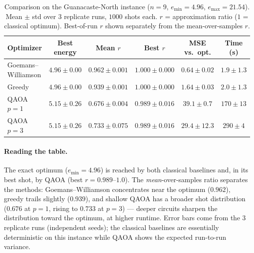 \documentclass[10pt]{article}
\begin{document}
\begin{table}[h]
\centering
\small
\caption{Comparison on the Guanacaste-North instance ($n=9$, $e_{\min}=4.96$,
$e_{\max}=21.54$). Mean $\pm$ std over $3$ replicate runs, $1000$ shots each.
$r$ = approximation ratio ($1$ = classical optimum). Best-of-run $r$ shown
separately from the mean-over-samples $r$.}
\label{tab:results}
\begin{tabular}{@{}lccccc@{}}
\toprule
Optimizer & Best energy & Mean $r$ & Best $r$ & MSE vs.\ opt. & Time (s)\\
\midrule
Goemans--Williamson & $4.96\pm0.00$ & $0.962\pm0.001$ & $1.000\pm0.000$ & $0.64\pm0.02$ & $1.9\pm1.3$\\
Greedy              & $4.96\pm0.00$ & $0.939\pm0.001$ & $1.000\pm0.000$ & $1.64\pm0.03$ & $2.0\pm1.3$\\
QAOA $p=1$          & $5.15\pm0.26$ & $0.676\pm0.004$ & $0.989\pm0.016$ & $39.1\pm0.7$  & $170\pm13$\\
QAOA $p=3$          & $5.15\pm0.26$ & $0.733\pm0.075$ & $0.989\pm0.016$ & $29.4\pm12.3$ & $290\pm4$\\
\bottomrule
\end{tabular}
\end{table}

\paragraph{Reading the table.} The exact optimum ($e_{\min}=4.96$) is reached
by both classical baselines and, in its best shot, by QAOA (best
$r=0.989$--$1.0$). The \emph{mean}-over-samples ratio separates the methods:
Goemans--Williamson concentrates near the optimum ($0.962$), greedy trails
slightly ($0.939$), and shallow QAOA has a broader shot distribution
($0.676$ at $p=1$, rising to $0.733$ at $p=3$) --- deeper circuits sharpen the
distribution toward the optimum, at higher runtime. Error bars come from the
$3$ replicate runs (independent seeds); the classical baselines are essentially
deterministic on this instance while QAOA shows the expected run-to-run variance.
\end{document}
